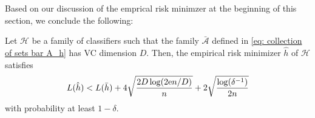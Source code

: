 Based on our discussion of the emprical risk minimzer at the beginning of this section, we conclude the following:

\begin{corollary}
Let $\mathcal{H}$ be a family of classifiers such that the family $\bar{\mathcal{A}}$ defined in \eqref{eq: collection of sets bar A_h} has VC dimension $D$. Then, the empirical risk minimizer $\hat h$ of $\mathcal{H}$ satisfies
\[
    L(\hat h) < L(\bar h) + 4 \sqrt{\frac{2D \log(2 \mathrm{e} n / D)}{n}} + 2 \sqrt{\frac{\log(\delta^{-1})}{2n}}
\]
with probability at least $1 - \delta$.
\end{corollary}
